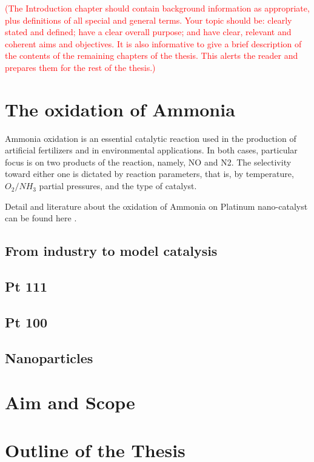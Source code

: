 \textcolor{red}{(The Introduction chapter should contain background information as appropriate, plus definitions of all special and general terms. Your topic should be: clearly stated and defined; have a clear overall purpose; and have clear, relevant and coherent aims and objectives. It is also informative to give a brief description of the contents of the remaining chapters of the thesis. This alerts the reader and prepares them for the rest of the thesis.)}

\section{The oxidation of Ammonia}

Ammonia oxidation is an essential catalytic reaction used in the production of artificial fertilizers and in environmental applications. In both cases, particular focus is on two products of the reaction, namely, NO and N2. The selectivity toward either one is dictated by reaction parameters, that is, by temperature, $O_2/NH_3$ partial pressures, and the type of catalyst.

Detail and literature about the oxidation of Ammonia on Platinum nano-catalyst can be found here \parencite{Resta2020a}.

\subsection{From industry to model catalysis}

\subsection{Pt 111}
\subsection{Pt 100}
\subsection{Nanoparticles}
\lipsum

\section{Aim and Scope}


\lipsum


\section{Outline of the Thesis}


\lipsum

